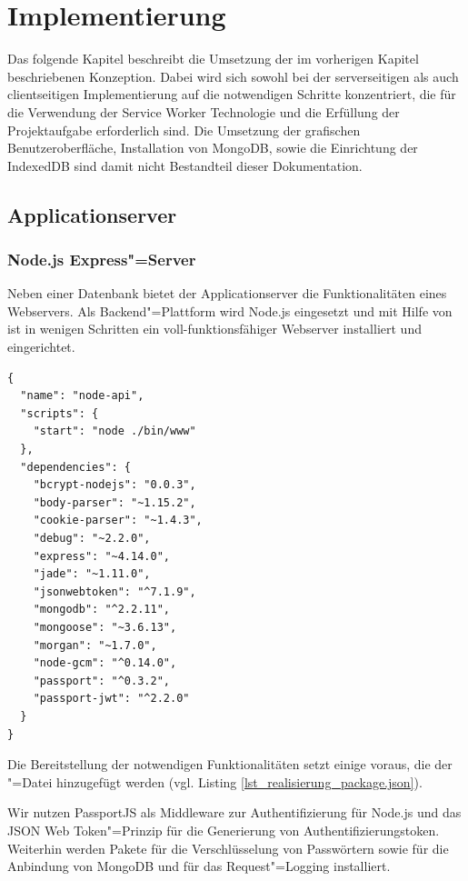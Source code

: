 \chapter{Implementierung}

Das folgende Kapitel beschreibt die Umsetzung der im vorherigen Kapitel beschriebenen Konzeption. Dabei wird sich sowohl bei der serverseitigen als auch clientseitigen Implementierung auf die notwendigen Schritte konzentriert, die für die Verwendung der Service Worker Technologie und die Erfüllung der Projektaufgabe erforderlich sind. Die Umsetzung der grafischen Benutzeroberfläche, Installation von MongoDB, sowie die Einrichtung der IndexedDB sind damit nicht Bestandteil dieser Dokumentation.

\section{Applicationserver}

\subsection{Node.js Express"=Server}
\label{subsec_implementierung_applicationserver}

Neben einer Datenbank bietet der Applicationserver die Funktionalitäten eines Webservers. Als Backend"=Plattform wird Node.js eingesetzt und mit Hilfe von  ist in wenigen Schritten ein voll-funktionsfähiger Webserver installiert und eingerichtet. \\

\begin{lstlisting}[caption={package.json - notwendige Node.js Pakete},label={lst_realisierung_package.json}, frame=single]
{
  "name": "node-api",
  "scripts": {
    "start": "node ./bin/www"
  },
  "dependencies": {
    "bcrypt-nodejs": "0.0.3",
    "body-parser": "~1.15.2",
    "cookie-parser": "~1.4.3",
    "debug": "~2.2.0",
    "express": "~4.14.0",
    "jade": "~1.11.0",
    "jsonwebtoken": "^7.1.9",
    "mongodb": "^2.2.11",
    "mongoose": "~3.6.13",
    "morgan": "~1.7.0",
    "node-gcm": "^0.14.0",
    "passport": "^0.3.2",
    "passport-jwt": "^2.2.0"
  }
}
\end{lstlisting}


Die Bereitstellung der notwendigen Funktionalitäten setzt einige  voraus, die der "=Datei hinzugefügt werden (vgl. Listing \ref{lst_realisierung_package.json}). 

Wir nutzen \glqq PassportJS\grqq{} als Middleware zur Authentifizierung für Node.js und das \glqq JSON Web Token\grqq "=Prinzip für die Generierung von Authentifizierungstoken. Weiterhin werden Pakete für die Verschlüsselung von Passwörtern sowie für die Anbindung von MongoDB und  für das Request"=Logging installiert.

